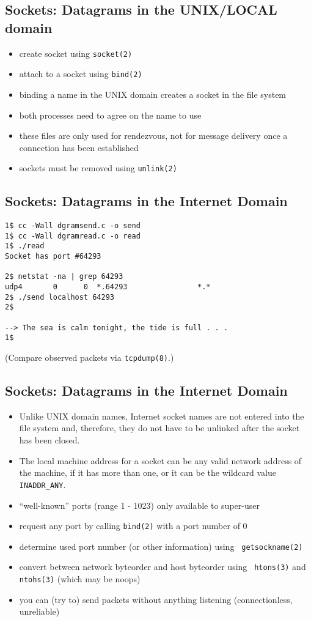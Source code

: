 \documentclass[xga]{xdvislides}
\begin{document}
\subsection{Sockets: Datagrams in the UNIX/LOCAL domain}
\begin{itemize}
	\item create socket using {\tt socket(2)}
	\item attach to a socket using {\tt bind(2)}
	\item binding a name in the UNIX domain creates a socket in the file system
	\item both processes need to agree on the name to use
	\item these files are only used for rendezvous, not for message delivery
		once a connection has been established
	\item sockets must be removed using {\tt unlink(2)}
\end{itemize}

\subsection{Sockets: Datagrams in the Internet Domain}
\begin{verbatim}
1$ cc -Wall dgramsend.c -o send
1$ cc -Wall dgramread.c -o read
1$ ./read
Socket has port #64293

2$ netstat -na | grep 64293
udp4       0      0  *.64293                *.*
2$ ./send localhost 64293
2$

--> The sea is calm tonight, the tide is full . . .
1$
\end{verbatim}
\vfill
(Compare observed packets via {\tt tcpdump(8)}.)

\subsection{Sockets: Datagrams in the Internet Domain}
\begin{itemize}
	\item Unlike UNIX domain names, Internet socket names are not entered into
		the file system and, therefore, they do not have to be unlinked after the
		socket has been closed.
	\item The local machine address for a socket can be any valid network address
		of the machine, if it has more than one, or it can be the wildcard value
		{\tt INADDR\_ANY}.
	\item ``well-known'' ports (range 1 - 1023) only available to super-user
	\item request any port by calling {\tt bind(2)} with a port number of 0
	\item determine used port number (or other information) using {\tt
		getsockname(2)}
	\item convert between network byteorder and host byteorder using {\tt
		htons(3)} and {\tt ntohs(3)} (which may be noops)
	\item you can (try to) send packets without anything listening (connectionless, unreliable)
\end{itemize}
\end{document}
